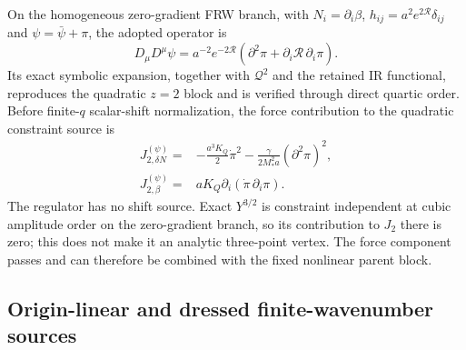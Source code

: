 On the homogeneous zero-gradient FRW branch, with
$N_i=\partial_i\beta$, $h_{ij}=a^2e^{2\mathcal R}\delta_{ij}$ and
$\psi=\bar\psi+\pi$, the adopted operator is
\begin{equation}
 D_\mu D^\mu\psi
 =a^{-2}e^{-2\mathcal R}
  (\partial^2\pi+\partial_i\mathcal R\,\partial_i\pi).
 \label{eq:track-a-adm-laplacian}
\end{equation}
Its exact symbolic expansion, together with $\mathcal Q^2$ and the retained IR
functional, reproduces the quadratic $z=2$ block and is verified through
direct quartic order.  Before finite-$q$ scalar-shift normalization, the force
contribution to the quadratic constraint source is
\begin{align}
 J_{2,\delta N}^{(\psi)}={}&-\frac{a^3K_Q}{2}\dot\pi^2
 -\frac{\gamma}{2M_*^2a}(\partial^2\pi)^2,
 \nonumber\\
 J_{2,\beta}^{(\psi)}={}&aK_Q\partial_i
 (\dot\pi\,\partial_i\pi).
 \label{eq:track-a-force-j2}
\end{align}
The regulator has no shift source.  Exact $Y^{3/2}$ is constraint independent
at cubic amplitude order on the zero-gradient branch, so its contribution to
$J_2$ there is zero; this does not make it an analytic three-point vertex.
The force component passes and can therefore be combined with the fixed
nonlinear parent block.

\subsection{Origin-linear and dressed finite-wavenumber sources}

